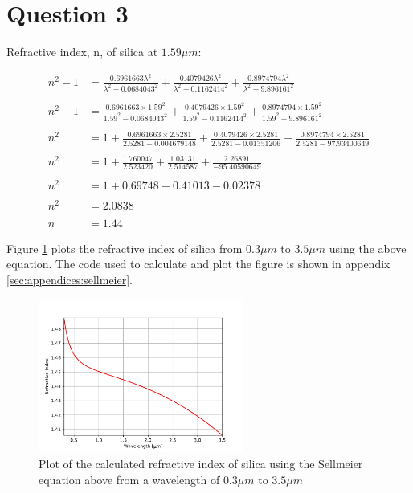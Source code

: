 \section{Question 3}

Refractive index, n, of silica at $1.59\mu m$:

\begin{align*}
  n^2 - 1 &= \frac{0.6961663\lambda^2}{\lambda^2 - 0.0684043^2} + \frac{0.4079426\lambda^2}{\lambda^2 - 0.1162414^2} + \frac{0.8974794\lambda^2}{\lambda^2 - 9.896161^2} \\
  \\
  n^2 - 1 &= \frac{0.6961663\times1.59^2}{1.59^2 - 0.0684043^2} + \frac{0.4079426\times1.59^2}{1.59^2 - 0.1162414^2} + \frac{0.8974794\times1.59^2}{1.59^2 - 9.896161^2}\\
  \\
  n^2 &= 1 + \frac{0.6961663\times2.5281}{2.5281 - 0.004679148} + \frac{0.4079426\times2.5281}{2.5281 - 0.01351206} + \frac{0.8974794\times2.5281}{2.5281 - 97.93400649}\\
  \\
  n^2 &= 1 + \frac{1.760047}{2.523420} + \frac{1.03131}{2.514587} + \frac{2.26891}{-95.40590649}\\
  \\
  n^2 &= 1 + 0.69748 + 0.41013 - 0.02378\\
  \\
  n^2 &= 2.0838\\
  \\
  n &= 1.44
\end{align*}

Figure \ref{fig:ri_silica} plots the refractive index of silica from $0.3\mu m$ to $3.5\mu m$ using the above equation. The code used to calculate and plot the figure is shown in appendix \ref{sec:appendices:sellmeier}.

\begin{figure}[!htb]
\centering
\includegraphics[width = 0.6\textwidth]{Figures/silica_refractive_index.pdf}
\caption{Plot of the calculated refractive index of silica using the Sellmeier equation above from a wavelength of $0.3\mu m$ to $3.5\mu m$}
\label{fig:ri_silica}
\end{figure}
